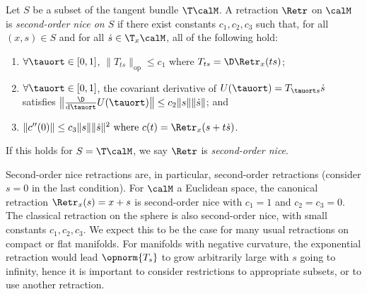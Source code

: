 \begin{definition} \label{def:retrscndnice}
	Let $S$ be a subset of the tangent bundle $\T\calM$.
	A retraction $\Retr$ on $\calM$ is \emph{second-order nice on $S$} if there exist constants $c_1, c_2, c_3$ such that, for all $(x, s) \in S$ and for all $\dot s \in \T_x\calM$, all of the following hold:
	\begin{enumerate}
		\item $\forall \tauort \in [0, 1]$, $\|T_{ts}\|_{\mathrm{op}} \leq c_1$ where $T_{ts} = \D\Retr_x(ts)$; %
		\item $\forall \tauort \in [0, 1]$, the covariant derivative of $U(\tauort) = T_{\tauort s} \dot s$ satisfies  $\left\| \frac{\D}{\mathrm{d}\tauort} U(\tauort) \right\| \leq c_2 \|s\|\|\dot s\|$;  and
		\item $\|c''(0)\| \leq c_3 \|s\| \|\dot s\|^2 \textrm{ where } c(t) = \Retr_x(s+t\dot s)$.
	\end{enumerate}
	If this holds for $S = \T\calM$, we say $\Retr$ is \emph{second-order nice}.
\end{definition}
Second-order nice retractions are, in particular, second-order retractions (consider $s = 0$ in the last condition).
For $\calM$ a Euclidean space, the canonical retraction $\Retr_x(s) = x+s$ is second-order nice with $c_1 = 1$ and $c_2 = c_3 = 0$.
The classical retraction on the sphere is also second-order nice, with small constants $c_1, c_2, c_3$. We expect this to be the case for many usual retractions on compact or flat manifolds. %
For manifolds with negative curvature, the exponential retraction would lead $\opnorm{T_{s}}$ to grow arbitrarily large with $s$ going to infinity, hence it is important to consider restrictions to appropriate subsets, or to use another retraction.
